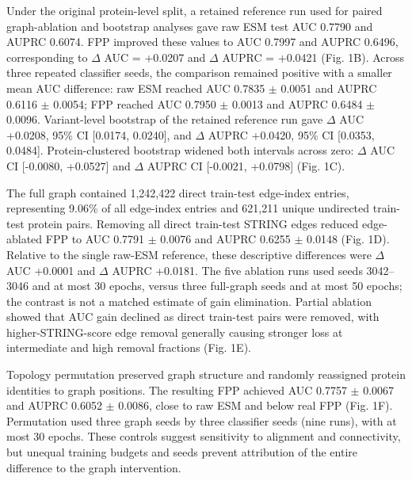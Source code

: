 \documentclass[conference]{IEEEtran}
\begin{document}
Under the original protein-level split, a retained reference run used for paired graph-ablation and bootstrap analyses gave raw ESM test AUC 0.7790 and AUPRC 0.6074. FPP improved these values to AUC 0.7997 and AUPRC 0.6496, corresponding to $\Delta$ AUC = +0.0207 and $\Delta$ AUPRC = +0.0421 (Fig. 1B). Across three repeated classifier seeds, the comparison remained positive with a smaller mean AUC difference: raw ESM reached AUC 0.7835 $\pm$ 0.0051 and AUPRC 0.6116 $\pm$ 0.0054; FPP reached AUC 0.7950 $\pm$ 0.0013 and AUPRC 0.6484 $\pm$ 0.0096. Variant-level bootstrap of the retained reference run gave $\Delta$ AUC +0.0208, 95\% CI [0.0174, 0.0240], and $\Delta$ AUPRC +0.0420, 95\% CI [0.0353, 0.0484]. Protein-clustered bootstrap widened both intervals across zero: $\Delta$ AUC CI [-0.0080, +0.0527] and $\Delta$ AUPRC CI [-0.0021, +0.0798] (Fig. 1C).

The full graph contained 1,242,422 direct train-test edge-index entries, representing 9.06\% of all edge-index entries and 621,211 unique undirected train-test protein pairs. Removing all direct train-test STRING edges reduced edge-ablated FPP to AUC 0.7791 $\pm$ 0.0076 and AUPRC 0.6255 $\pm$ 0.0148 (Fig. 1D). Relative to the single raw-ESM reference, these descriptive differences were $\Delta$ AUC +0.0001 and $\Delta$ AUPRC +0.0181. The five ablation runs used seeds 3042--3046 and at most 30 epochs, versus three full-graph seeds and at most 50 epochs; the contrast is not a matched estimate of gain elimination. Partial ablation showed that AUC gain declined as direct train-test pairs were removed, with higher-STRING-score edge removal generally causing stronger loss at intermediate and high removal fractions (Fig. 1E).

Topology permutation preserved graph structure and randomly reassigned protein identities to graph positions. The resulting FPP achieved AUC 0.7757 $\pm$ 0.0067 and AUPRC 0.6052 $\pm$ 0.0086, close to raw ESM and below real FPP (Fig. 1F). Permutation used three graph seeds by three classifier seeds (nine runs), with at most 30 epochs. These controls suggest sensitivity to alignment and connectivity, but unequal training budgets and seeds prevent attribution of the entire difference to the graph intervention.
\end{document}
